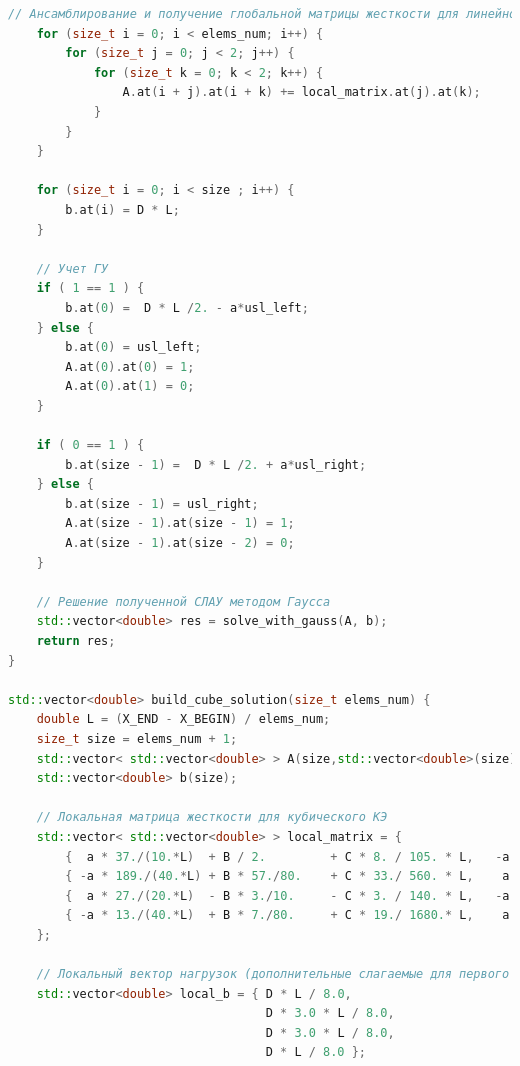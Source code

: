 \begin{lstlisting}[language=c++, label=prog,caption={\textit{Реализация МКЭ}}]
    // Ансамблирование и получение глобальной матрицы жесткости для линейного КЭ
    for (size_t i = 0; i < elems_num; i++) {
        for (size_t j = 0; j < 2; j++) {
            for (size_t k = 0; k < 2; k++) {
                A.at(i + j).at(i + k) += local_matrix.at(j).at(k);
            }
        }
    }

    for (size_t i = 0; i < size ; i++) {
        b.at(i) = D * L;
    }

    // Учет ГУ
    if ( 1 == 1 ) {
        b.at(0) =  D * L /2. - a*usl_left;
    } else {
        b.at(0) = usl_left;
        A.at(0).at(0) = 1;
        A.at(0).at(1) = 0;
    }

    if ( 0 == 1 ) {
        b.at(size - 1) =  D * L /2. + a*usl_right;
    } else {
        b.at(size - 1) = usl_right;
        A.at(size - 1).at(size - 1) = 1;
        A.at(size - 1).at(size - 2) = 0;
    }

    // Решение полученной СЛАУ методом Гаусса
    std::vector<double> res = solve_with_gauss(A, b);
    return res;
}

std::vector<double> build_cube_solution(size_t elems_num) {
    double L = (X_END - X_BEGIN) / elems_num;
    size_t size = elems_num + 1;
    std::vector< std::vector<double> > A(size,std::vector<double>(size));
    std::vector<double> b(size);
    
    // Локальная матрица жесткости для кубического КЭ
    std::vector< std::vector<double> > local_matrix = {
        {  a * 37./(10.*L)  + B / 2.         + C * 8. / 105. * L,   -a * 189./(40.*L) - B * 57./80.  + C * 33. / 560. * L,   a * 27./(20.*L)   + B * 3./10.   - C * 3.  / 140. * L,   -a * 13./(40.*L)   - B * 7./80.   + C * 19.  / 1680. * L},
        { -a * 189./(40.*L) + B * 57./80.    + C * 33./ 560. * L,    a * 54./(5.*L)   + 0.           + C * 27. /  70. * L,  -a * 297./(40.*L)  - B * 81./80.  - C * 27. / 560. * L,    a * 27./(20.*L)   + B * 3./10.   - C * 3.   /  140. * L},
        {  a * 27./(20.*L)  - B * 3./10.     - C * 3. / 140. * L,   -a * 297./(40.*L) + B * 81./80.  - C * 27. / 560. * L,   a * 54./(5.*L)    - 0.           + C * 27. / 70.  * L,   -a * 189./(40.*L)  - B * 57./80.  + C * 33.  /  560. * L},
        { -a * 13./(40.*L)  + B * 7./80.     + C * 19./ 1680.* L,    a * 27./(20.*L)  - B * 3./10.   + C * 3.  / 140. * L,  -a * 189./(40.*L)  + B * 57./80.  + C * 33. / 560. * L,    a * 37./(10.*L)   - B * 1./2.    + C * 8.   /  105. * L}
    };
    
    // Локальный вектор нагрузок (дополнительные слагаемые для первого и последнего элементов учитываются далее)
    std::vector<double> local_b = { D * L / 8.0,
                                    D * 3.0 * L / 8.0,
                                    D * 3.0 * L / 8.0,
                                    D * L / 8.0 };


\end{lstlisting}
